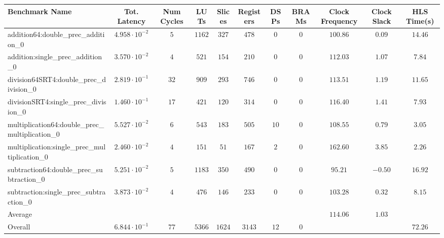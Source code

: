 \begin{tabular}{|l|c|c|c|c|c|c|c|c|c|c|}
\hline
Benchmark Name                                   & Tot. Latency            & Num Cycles & LUTs     & Slices   & Registers & DSPs   & BRAMs & Clock Frequency & Clock Slack & HLS Time(s) \\
\hline
addition64:double\_prec\_addition\_0             & $ 4.958 \cdot 10^{-2} $ & $ 5      $ & $ 1162 $ & $ 327  $ & $ 478   $ & $ 0  $ & $ 0 $ & $ 100.86      $ & $ 0.09    $ & $ 14.46   $ \\
addition:single\_prec\_addition\_0               & $ 3.570 \cdot 10^{-2} $ & $ 4      $ & $ 521  $ & $ 154  $ & $ 210   $ & $ 0  $ & $ 0 $ & $ 112.03      $ & $ 1.07    $ & $ 7.84    $ \\
division64SRT4:double\_prec\_division\_0         & $ 2.819 \cdot 10^{-1} $ & $ 32     $ & $ 909  $ & $ 293  $ & $ 746   $ & $ 0  $ & $ 0 $ & $ 113.51      $ & $ 1.19    $ & $ 11.65   $ \\
divisionSRT4:single\_prec\_division\_0           & $ 1.460 \cdot 10^{-1} $ & $ 17     $ & $ 421  $ & $ 120  $ & $ 314   $ & $ 0  $ & $ 0 $ & $ 116.40      $ & $ 1.41    $ & $ 7.93    $ \\
multiplication64:double\_prec\_multiplication\_0 & $ 5.527 \cdot 10^{-2} $ & $ 6      $ & $ 543  $ & $ 183  $ & $ 505   $ & $ 10 $ & $ 0 $ & $ 108.55      $ & $ 0.79    $ & $ 3.05    $ \\
multiplication:single\_prec\_multiplication\_0   & $ 2.460 \cdot 10^{-2} $ & $ 4      $ & $ 151  $ & $ 51   $ & $ 167   $ & $ 2  $ & $ 0 $ & $ 162.60      $ & $ 3.85    $ & $ 2.26    $ \\
subtraction64:double\_prec\_subtraction\_0       & $ 5.251 \cdot 10^{-2} $ & $ 5      $ & $ 1183 $ & $ 350  $ & $ 490   $ & $ 0  $ & $ 0 $ & $ 95.21       $ & $ -0.50   $ & $ 16.92   $ \\
subtraction:single\_prec\_subtraction\_0         & $ 3.873 \cdot 10^{-2} $ & $ 4      $ & $ 476  $ & $ 146  $ & $ 233   $ & $ 0  $ & $ 0 $ & $ 103.28      $ & $ 0.32    $ & $ 8.15    $ \\
\hline
Average                                          & $                     $ & $        $ & $      $ & $      $ & $       $ & $    $ & $   $ & $ 114.06      $ & $ 1.03    $ & $         $ \\
\hline
Overall                                          & $ 6.844 \cdot 10^{-1} $ & $ 77     $ & $ 5366 $ & $ 1624 $ & $ 3143  $ & $ 12 $ & $ 0 $ & $             $ & $         $ & $ 72.26   $ \\
\hline
\end{tabular}
